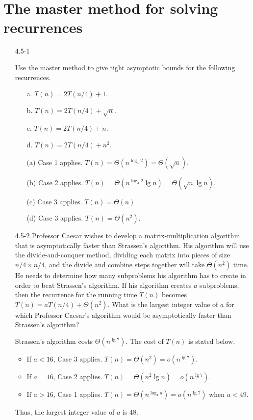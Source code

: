 \newpage

\section{The master method for solving recurrences}

\begin{enumerate}

\item[4.5{-}1]{Use the master method to give tight asymptotic bounds for the
following recurrences.

\begin{enumerate}
  \item[a.] $T(n) = 2T(n/4) + 1$.
  \item[b.] $T(n) = 2T(n/4) + \sqrt{n}$.
  \item[c.] $T(n) = 2T(n/4) + n$.
  \item[d.] $T(n) = 2T(n/4) + n^2$.
\end{enumerate}
}

\begin{framed}
\begin{enumerate}
  \item[(a)] Case 1 applies. $T(n) = \Theta(n^{\log_4{2}}) = \Theta(\sqrt{n})$.
  \item[(b)] Case 2 applies. $T(n) = \Theta(n^{\log_4{2}} \lg n) = \Theta(\sqrt{n} \lg n)$.
  \item[(c)] Case 3 applies. $T(n) = \Theta(n)$.
  \item[(d)] Case 3 applies. $T(n) = \Theta(n^2)$.
\end{enumerate}
\end{framed}

\item[4.5{-}2]{Professor Caesar wishes to develop a matrix-multiplication
algorithm that is asymptotically faster than Strassen's algorithm. His algorithm
will use the divide-and-conquer method, dividing each matrix into pieces of
size $n/4 \times n/4$, and the divide and combine steps together will take
$\Theta(n^2)$ time. He needs to determine how many subproblems his algorithm has
to create in order to beat Strassen's algorithm. If his algorithm creates $a$
subproblems, then the recurrence for the running time $T(n)$ becomes
$T(n) = a T(n/4) + \Theta(n^2)$. What is the largest integer value of $a$ for
which Professor Caesar's algorithm would be asymptotically faster than
Strassen's algorithm?}

\begin{framed}
Strassen's algorithm costs $\Theta(n^{\lg 7})$. The cost of $T(n)$ is stated
below.
\begin{itemize}
  \item If $a < 16$, Case 3 applies. $T(n) = \Theta(n^2) = o(n^{\lg 7})$.
  \item If $a = 16$, Case 2 applies. $T(n) = \Theta(n^2 \lg n) = o(n^{\lg 7})$.
  \item If $a > 16$, Case 1 applies. $T(n) = \Theta(n^{\log_4{a}}) = o(n^{\lg 7})$ when $a < 49$.
\end{itemize}
Thus, the largest integer value of $a$ is 48.
\end{framed}


\end{enumerate}
